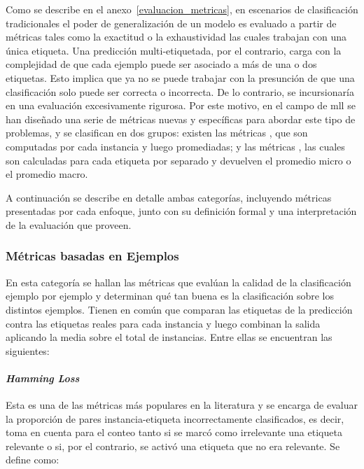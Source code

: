 Como se describe en el anexo~\ref{evaluacion_metricas}, en escenarios de
clasificación tradicionales el poder de generalización de un modelo es evaluado
a partir de métricas tales como la exactitud o la exhaustividad las cuales
trabajan con una única etiqueta. Una predicción multi-etiquetada, por el
contrario, carga con la complejidad de que cada ejemplo puede ser asociado a más
de una o dos etiquetas. Esto implica que ya no se puede trabajar con la
presunción de que una clasificación solo puede ser correcta o incorrecta. De lo
contrario, se incursionaría en una evaluación excesivamente rigurosa. Por este
motivo, en el campo de \acrshort{mll} se han diseñado una serie de métricas
nuevas y específicas para abordar este tipo de problemas, y se clasifican en dos
grupos: existen las métricas , que son computadas
por cada instancia y luego promediadas; y las métricas , las cuales son calculadas para cada etiqueta por separado y
devuelven el promedio micro o el promedio macro.

A continuación se describe en detalle ambas categorías, incluyendo métricas
presentadas por cada enfoque, junto con su definición formal y una
interpretación de la evaluación que proveen.

\subsubsection{Métricas basadas en Ejemplos}

En esta categoría se hallan las métricas que evalúan la calidad de la
clasificación ejemplo por ejemplo y determinan qué tan buena es la clasificación
sobre los distintos ejemplos. Tienen en común que comparan las etiquetas de la
predicción contra las etiquetas reales para cada instancia y luego combinan la
salida aplicando la media sobre el total de instancias. Entre ellas se
encuentran las siguientes:

\paragraph{\textit{Hamming Loss}}

Esta es una de las métricas más populares en la literatura y se encarga de
evaluar la proporción de pares instancia-etiqueta incorrectamente clasificados,
es decir, toma en cuenta para el conteo tanto si se marcó como irrelevante una
etiqueta relevante o si, por el contrario, se activó una etiqueta que no era
relevante. Se define como:

